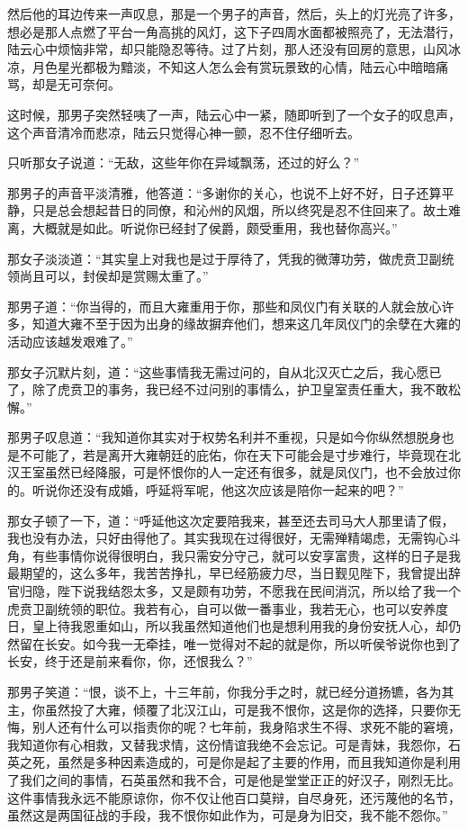然后他的耳边传来一声叹息，那是一个男子的声音，然后，头上的灯光亮了许多，想必是那人点燃了平台一角高挑的风灯，这下子四周水面都被照亮了，无法潜行，陆云心中烦恼非常，却只能隐忍等待。过了片刻，那人还没有回房的意思，山风冰凉，月色星光都极为黯淡，不知这人怎么会有赏玩景致的心情，陆云心中暗暗痛骂，却是无可奈何。

这时候，那男子突然轻咦了一声，陆云心中一紧，随即听到了一个女子的叹息声，这个声音清冷而悲凉，陆云只觉得心神一颤，忍不住仔细听去。

只听那女子说道：“无敌，这些年你在异域飘荡，还过的好么？”

那男子的声音平淡清雅，他答道：“多谢你的关心，也说不上好不好，日子还算平静，只是总会想起昔日的同僚，和沁州的风烟，所以终究是忍不住回来了。故土难离，大概就是如此。听说你已经封了侯爵，颇受重用，我也替你高兴。”

那女子淡淡道：“其实皇上对我也是过于厚待了，凭我的微薄功劳，做虎贲卫副统领尚且可以，封侯却是赏赐太重了。”

那男子道：“你当得的，而且大雍重用于你，那些和凤仪门有关联的人就会放心许多，知道大雍不至于因为出身的缘故摒弃他们，想来这几年凤仪门的余孽在大雍的活动应该越发艰难了。”

那女子沉默片刻，道：“这些事情我无需过问的，自从北汉灭亡之后，我心愿已了，除了虎贲卫的事务，我已经不过问别的事情么，护卫皇室责任重大，我不敢松懈。”

那男子叹息道：“我知道你其实对于权势名利并不重视，只是如今你纵然想脱身也是不可能了，若是离开大雍朝廷的庇佑，你在天下可能会是寸步难行，毕竟现在北汉王室虽然已经降服，可是怀恨你的人一定还有很多，就是凤仪门，也不会放过你的。听说你还没有成婚，呼延将军呢，他这次应该是陪你一起来的吧？”

那女子顿了一下，道：“呼延他这次定要陪我来，甚至还去司马大人那里请了假，我也没有办法，只好由得他了。其实我现在过得很好，无需殚精竭虑，无需钩心斗角，有些事情你说得很明白，我只需安分守己，就可以安享富贵，这样的日子是我最期望的，这么多年，我苦苦挣扎，早已经筋疲力尽，当日觐见陛下，我曾提出辞官归隐，陛下说我结怨太多，又是颇有功劳，不愿我在民间消沉，所以给了我一个虎贲卫副统领的职位。我若有心，自可以做一番事业，我若无心，也可以安养度日，皇上待我恩重如山，所以我虽然知道他们也是想利用我的身份安抚人心，却仍然留在长安。如今我一无牵挂，唯一觉得对不起的就是你，所以听侯爷说你也到了长安，终于还是前来看你，你，还恨我么？”

那男子笑道：“恨，谈不上，十三年前，你我分手之时，就已经分道扬镳，各为其主，你虽然投了大雍，倾覆了北汉江山，可是我不恨你，这是你的选择，只要你无悔，别人还有什么可以指责你的呢？七年前，我身陷求生不得、求死不能的窘境，我知道你有心相救，又替我求情，这份情谊我绝不会忘记。可是青妹，我怨你，石英之死，虽然是多种因素造成的，可是你是起了主要的作用，而且我知道你是利用了我们之间的事情，石英虽然和我不合，可是他是堂堂正正的好汉子，刚烈无比。这件事情我永远不能原谅你，你不仅让他百口莫辩，自尽身死，还污蔑他的名节，虽然这是两国征战的手段，我不恨你如此作为，可是身为旧交，我不能不怨你。”

